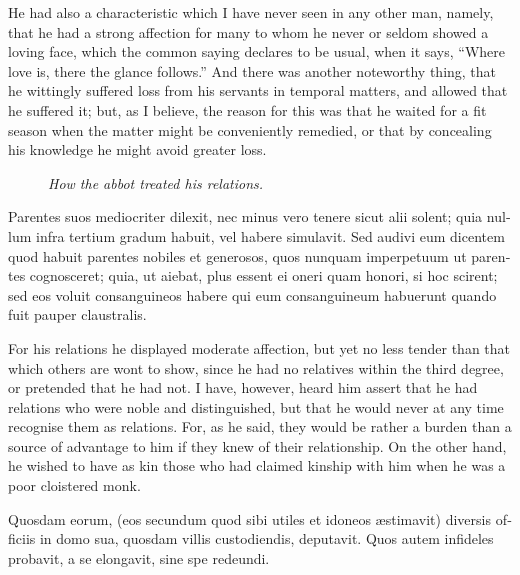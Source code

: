 \documentclass[10pt]{book}
\newcommand{\blockhead}[4][]{
\begin{figure}
\centering
\vspace{#4}
\parbox{2.75cm}{\begin{center}\footnotesize \color{BrickRed} \emph{#2}\\ #1 \end{center}}
\end{figure}
}
\begin{document}
\begin{paracol}{2}
\switchcolumn

He had also a characteristic which I have never seen in any other man, namely, that he had a strong affection for many to whom he never or seldom showed a loving face, which the common saying declares to be usual, when it says, ``Where love is, there the glance follows.'' And there was another noteworthy thing, that he wittingly suffered loss from his servants in temporal matters, and allowed that he suffered it; but, as I believe, the reason for this was that he waited for a fit season when the matter might be conveniently remedied, or that by concealing his knowledge he might avoid greater loss.

\switchcolumn*

\begin{otherlanguage}{latin}
\blockhead{How the abbot treated his relations.}{3}{-0.55cm}
Parentes suos mediocriter dilexit, nec minus vero tenere sicut alii solent; quia nullum infra tertium gradum habuit, vel habere simulavit. Sed audivi eum dicentem quod habuit parentes nobiles et generosos, quos nunquam imperpetuum ut parentes cognosceret; quia, ut aiebat, plus essent ei oneri quam honori, si hoc scirent; sed eos voluit consanguineos habere qui eum consanguineum habuerunt quando fuit pauper claustralis.

\end{otherlanguage}

\switchcolumn

For his relations he displayed moderate affection, but yet no less tender than that which others are wont to show, since he had no relatives within the third degree, or pretended that he had not. I have, however, heard him assert that he had relations who were noble and distinguished, but that he would never at any time recognise them as relations. For, as he said, they would be rather a burden than a source of advantage to him if they knew of their relationship. On the other hand, he wished to have as kin those who had claimed kinship with him when he was a poor cloistered monk.

\switchcolumn*

\begin{otherlanguage}{latin}
Quosdam eorum, (eos secundum quod sibi utiles et idoneos \ae{}stimavit) diversis officiis in domo sua, quosdam villis custodiendis, deputavit. Quos autem infideles probavit, a se elongavit, sine spe redeundi.
\end{otherlanguage}

\switchcolumn


\end{paracol}
\end{document}
